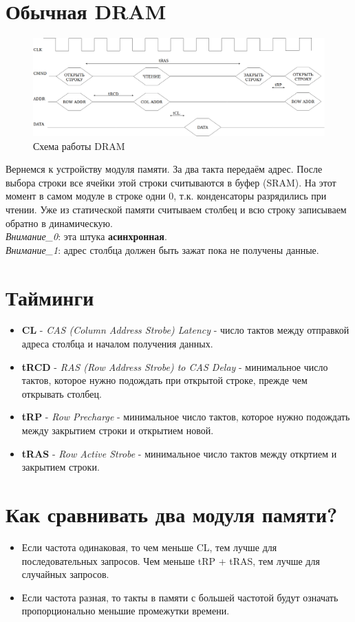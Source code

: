 \documentclass[12pt, a4paper]{article}
\begin{document}
\section{Обычная DRAM}
\begin{figure}[h]
    \centering
    \includegraphics[scale=0.2]{images/DRAM.png}
    \caption{Схема работы DRAM}
    \label{fig:DRAM}
\end{figure}
Вернемся к устройству модуля памяти. За два такта передаём адрес. После выбора строки все ячейки этой строки считываются в буфер (SRAM). На этот момент в самом модуле в строке одни $0$, т.к. конденсаторы разрядились при чтении. Уже из статической памяти считываем столбец и всю строку записываем обратно в динамическую.\\
\textit{Внимание\_0}: эта штука \textbf{асинхронная}.\\
\textit{Внимание\_1}: адрес столбца должен быть зажат пока не получены данные.
\section{Тайминги}
\begin{itemize}
    \item \textbf{CL} - \textit{CAS (Column Address Strobe) Latency} - число тактов между отправкой адреса столбца и началом получения данных.
    \item \textbf{tRCD} - \textit{RAS (Row Address Strobe) to CAS Delay} - минимальное число тактов, которое нужно подождать при открытой строке, прежде чем открывать столбец.
    \item \textbf{tRP} - \textit{Row Precharge} - минимальное число тактов, которое нужно подождать между закрытием строки и открытием новой.
    \item \textbf{tRAS} - \textit{Row Active Strobe} - минимальное число тактов между откртием и закрытием строки.
\end{itemize}
\section{Как сравнивать два модуля памяти?}
\begin{itemize}
    \item Если частота одинаковая, то чем меньше CL, тем лучше для последовательных запросов. Чем меньше tRP + tRAS, тем лучше для случайных запросов.
    \item Если частота разная, то такты в памяти с большей частотой будут означать пропорционально меньшие промежутки времени.
\end{itemize}
\end{document}
